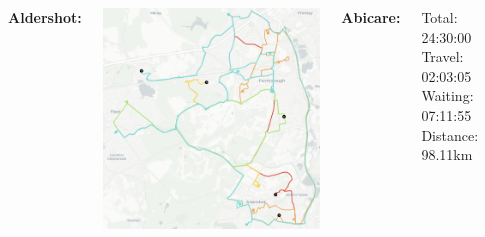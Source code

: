 \documentclass[usenames,dvipsnames]{beamer}
\begin{document}

\begin{frame} %
	\begin{columns}
		\begin{minipage}[c][0.05\textheight][c]{\linewidth}
			\hspace{37mm}
			\textbf{Aldershot:}
		\end{minipage}
		\begin{minipage}[c][0.7\textheight][c]{\linewidth}
			\centering
			\includegraphics[width=1\linewidth]{figures/06AldershotAbi}
		\end{minipage}
		\begin{minipage}[c][0.2\textheight][c]{\linewidth}
			\scriptsize
			\hspace{17mm}\textbf{Abicare:}
			\begin{itemize}
				\setlength{\itemindent}{0.5in}
				\aitem Total: 24:30:00
				\aitem Travel: 02:03:05
				\aitem Waiting: 07:11:55
				\aitem Distance: 98.11km
			\end{itemize}
		\end{minipage}
		\begin{minipage}[c][0.05\textheight][c]{\linewidth}

\end{minipage}
\end{columns}
\end{frame}
\end{document}
